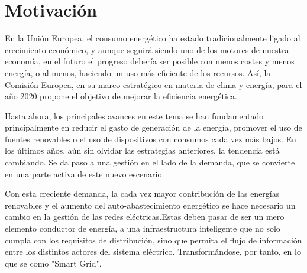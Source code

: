 \chapter{Motivación}
 En la Unión Europea, el consumo energético ha estado tradicionalmente ligado al crecimiento económico, y aunque seguirá siendo uno de los motores de nuestra economía, en el futuro el progreso debería ser posible con menos costes y menos energía, o al menos, haciendo un uso más eficiente de los recursos. Así, la Comisión Europea, en su marco estratégico en materia de clima y energía, para el año 2020 propone el objetivo de mejorar la eficiencia energética.
 
 Hasta ahora, los principales avances en este tema se han fundamentado principalmente en reducir el gasto de generación de la energía, promover el uso de fuentes renovables o el uso de dispositivos con consumos cada vez más bajos. En los últimos años, aún sin olvidar las estrategias anteriores, la tendencia está cambiando. Se da paso a una gestión en el lado de la demanda, que se convierte en una parte activa de este nuevo escenario. 
 
 Con esta creciente demanda, la cada vez mayor contribución de las energías renovables y el aumento del auto-abastecimiento energético se hace necesario un cambio en la gestión de las redes eléctricas.Estas deben pasar de ser un mero elemento conductor de energía, a una infraestructura inteligente que no solo cumpla con los requisitos de distribución, sino que permita el flujo de información entre los distintos actores del sistema eléctrico. Transformándose, por tanto, en lo que se como "Smart Grid".
 